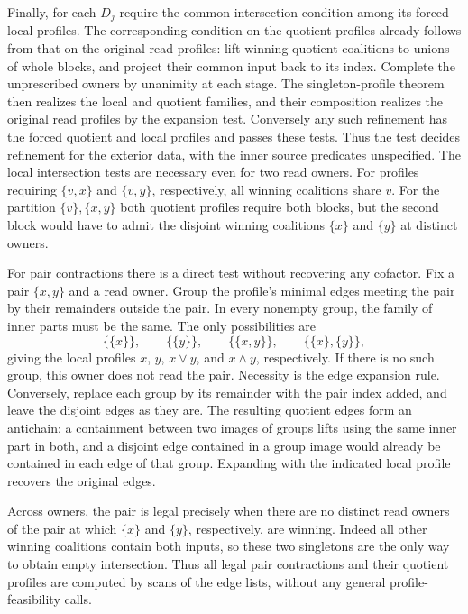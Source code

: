 Finally, for each $D_j$ require the common-intersection condition
among its forced local profiles. The corresponding condition
on the quotient profiles already follows from that on the
original read profiles: lift winning quotient coalitions to
unions of whole blocks, and project their common input back to
its index. Complete the unprescribed owners by unanimity at
each stage. The singleton-profile theorem then realizes the
local and quotient families, and their composition realizes
the original read profiles by the expansion test. Conversely
any such refinement has the forced quotient and local profiles
and passes these tests. Thus the test decides refinement for
the exterior data, with the inner source predicates unspecified.
The local intersection tests are necessary even for two read owners.
For profiles requiring $\{v,x\}$ and $\{v,y\}$, respectively,
all winning coalitions share $v$. For the partition
$\{v\},\{x,y\}$ both quotient profiles require both blocks, but
the second block would have to admit the disjoint winning
coalitions $\{x\}$ and $\{y\}$ at distinct owners.

For pair contractions there is a direct test without recovering
any cofactor. Fix a pair $\{x,y\}$ and a read owner. Group the
profile's minimal edges meeting the pair by their remainders
outside the pair. In every nonempty group, the family of inner
parts must be the same. The only possibilities are
\[
 \{\{x\}\},\qquad \{\{y\}\},\qquad
 \{\{x,y\}\},\qquad \{\{x\},\{y\}\},
\]
giving the local profiles $x$, $y$, $x\lor y$, and $x\land y$,
respectively. If there is no such group, this owner does not read
the pair. Necessity is the edge expansion rule. Conversely,
replace each group by its remainder with the pair index added,
and leave the disjoint edges as they are. The resulting quotient
edges form an antichain: a containment between two images of
groups lifts using the same inner part in both, and a disjoint
edge contained in a group image would already be contained in
each edge of that group. Expanding with the indicated local
profile recovers the original edges.

Across owners, the pair is legal precisely when there are no
distinct read owners of the pair at which $\{x\}$ and $\{y\}$,
respectively, are winning. Indeed all other winning coalitions
contain both inputs, so these two singletons are the only way to
obtain empty intersection. Thus all legal pair contractions and
their quotient profiles are computed by scans of the edge lists,
without any general profile-feasibility calls.

